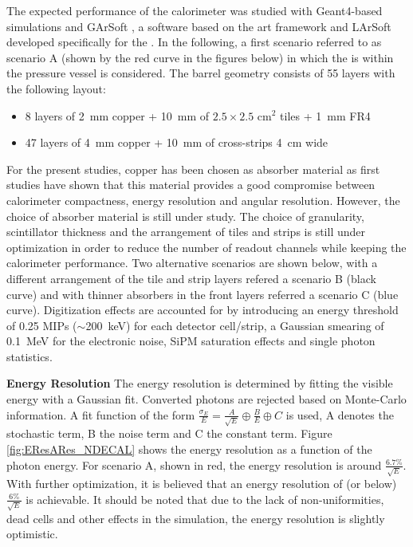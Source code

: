 The expected performance of the calorimeter was studied with Geant4-based \cite{Agostinelli:2002hh} simulations and GArSoft \cite{GArSoftwebsite}, a software based on the art framework \cite{ARTwebsite} and LArSoft \cite{Snider:2017wjd} developed specifically for the . In the following, a first scenario referred to as scenario A (shown by the red curve in the figures below) in which the  is within the pressure vessel is considered. The barrel geometry consists of 55 layers with the following layout:
\begin{itemize}
  \item 8 layers of \SI{2}{\mm} copper + \SI{10}{\mm} of $2.5\times2.5$ cm$^2$ tiles + \SI{1}{\mm} FR4
  \item 47 layers of \SI{4}{\mm} copper + \SI{10}{\mm} of cross-strips \SI{4}{\cm} wide
\end{itemize}
For the present studies, copper has been chosen as absorber material as first studies have shown that this material provides a good compromise between calorimeter compactness, energy resolution and angular resolution. However, the choice of absorber material is still under study. The choice of granularity, scintillator thickness and the arrangement of tiles and strips is still under optimization in order to reduce the number of readout channels while keeping the calorimeter performance. Two alternative scenarios are shown below, with a different arrangement of the tile and strip layers refered a scenario B (black curve) and with thinner absorbers in the front layers referred a scenario C (blue curve).
Digitization effects are accounted for by introducing an energy threshold of 0.25 MIPs ($\sim$\SI{200}{\keV}) for each detector cell/strip, a Gaussian smearing of \SI{0.1}{\MeV} for the electronic noise, SiPM saturation effects and single photon statistics.

\textbf{Energy Resolution} The energy resolution is determined by fitting the visible energy with a Gaussian fit. Converted photons are rejected based on Monte-Carlo information. A fit function of the form $\frac{\sigma_{E}}{E} = \frac{A}{\sqrt{E}} \oplus \frac{B}{E} \oplus C$ is used, A denotes the stochastic term, B the noise term and C the constant term. Figure \ref{fig:EResARes_NDECAL} shows the energy resolution as a function of the photon energy. For scenario A, shown in red, the energy resolution is around $\frac{6.7\%}{\sqrt{E}}$. With further optimization, it is believed that an energy resolution of (or below) $\frac{6\%}{\sqrt{E}}$ is achievable. It should be noted that due to the lack of non-uniformities, dead cells and other effects in the simulation, the energy resolution is slightly optimistic.

